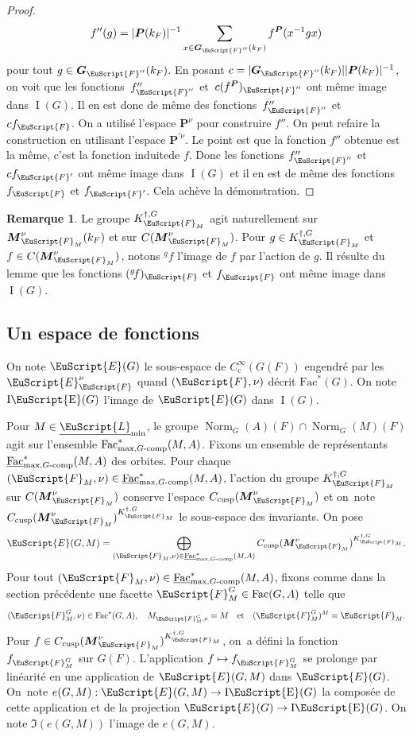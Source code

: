 \documentclass[JEP,XML,SOM,Unicode,francais]{cedram}
\let\mathcal \EuScript
\newcommand{\quadet}{\quad\text{et}\quad}
\newcommand\mto{\mathchoice{\longmapsto}{\mapsto}{\mapsto}{\mapsto}}
\newcommand{\gf}{{}^g\!f}
\newcommand{\rc}{\mathrm{c}}
\newcommand{\tcomp}{\textup{-comp}}
\newcommand{\cusp}{\mathrm{cusp}}
\newcommand{\Fac}{\mathrm{Fac}}
\DeclareMathOperator{\rI}{I}
\DeclareMathOperator{\rIE}{I\cE}
\DeclareMathOperator{\Norm}{Norm}
\newcommand{\bG}{\boldsymbol{G}}
\newcommand{\bM}{\boldsymbol{M}}
\newcommand{\bP}{\boldsymbol{P}}
\newcommand{\cE}{\mathcal{E}}
\newcommand{\cF}{\mathcal{F}}
\newcommand{\cL}{\mathcal{L}}
\theoremstyle{plain}
\theoremstyle{definition}
\newtheorem*{rem*}{Remarque}
\begin{document}
\begin{proof}
\[
f''(g)=\vert \bP(k_{F})\vert ^{-1}\sum_{x\in \bG_{\cF''}(k_{F})}f^{\bP}(x^{-1}gx)
\]
pour tout $g\in \bG_{\cF''}(k_{F})$. En posant $c=\vert \bG_{\cF''}(k_{F})\vert \vert \bP(k_{F})\vert ^{-1}$, on voit que les \hbox{fonctions~$f''_{\cF''}$} et~$c(f^{\bP})_{\cF''}$ ont même image dans $\rI(G)$. Il en est donc de même des fonctions~$f''_{\cF''}$ et~$cf_{\cF}$. On a utilisé l'espace $\bP^{\nu}$ pour construire $f''$. On peut refaire la construction en utilisant l'espace $\bP^{\prime\nu}$. Le point est que la fonction $f''$ obtenue est la même, c'est la fonction \og induite\fg de $f$. Donc les fonctions $f''_{\cF''}$ et $cf_{\cF'}$ ont même image dans $\rI(G)$ et il en est de même des fonctions $f_{\cF}$ et $f_{\cF'}$. Cela achève la démonstration.
\end{proof}

\begin{rem*}
Le groupe $ K_{\cF_{M}}^{\dag,G}$ agit naturellement sur $\bM_{\cF_{M}}^{\nu}(k_{F})$ et sur $C(\bM_{\cF_{M}}^{\nu})$. Pour $g\in K_{\cF_{M}}^{\dag,G}$ et $f\in C(\bM_{\cF_{M}}^{\nu})$, notons $\gf$ l'image de $f$ par l'action de $g$. Il résulte du lemme que les fonctions $(\gf)_{\cF}$ et $f_{\cF}$ ont même image dans $\rI(G)$.
\end{rem*}

\subsection{Un espace de fonctions}\label{unespacedefonctions}

On note $\cE(G)$ le sous-espace de $C_{\rc}^{\infty}(G(F))$ engendré par les $\cE_{\cF}^{\nu}$ quand $(\cF,\nu)$ décrit $\Fac^*(G)$. On note $\rIE(G)$ l'image de $\cE(G)$ dans $\rI(G)$.

Pour $M\in \underline{\cL}_{\min}$, le groupe $\Norm_{G}(A)(F)\cap \Norm_{G}(M)(F)$ agit sur l'ensemble $\Fac^*_{\max,G\tcomp}(M,A)$. Fixons un ensemble de représentants $ \underline{\Fac}^*_{\max,G\tcomp}(M,A)$ des orbites. Pour chaque $(\cF_{M},\nu)\in \underline{\Fac}^*_{\max,G\tcomp}(M,A)$, l'action du groupe $K_{\cF_{M}}^{\dag,G}$ sur $C(\bM_{\cF_{M}}^{\nu})$ conserve l'espace $C_{\cusp}(\bM^{\nu}_{\cF_{M}})$ et on~note $C_{\cusp}(\bM^{\nu}_{\cF_{M}})^{K_{\cF_{M}}^{\dag,G}}$ le sous-espace des invariants.
On pose
\[
\cE(G,M)=\bigoplus_{(\cF_{M},\nu)\in \underline{\Fac}^*_{\max,G\tcomp}(M,A)}C_{\cusp}(\bM^{\nu}_{\cF_{M}})^{K_{\cF_{M}}^{\dag,G}}.
\]
Pour tout $(\cF_{M},\nu)\in \underline{\Fac}^*_{\max,G\tcomp}(M,A)$, fixons comme dans la section précédente une facette $\cF_{M}^G\in \Fac(G,A)$ telle que
\[
(\cF_{M}^G,\nu)\in \Fac^*(G,A),\quad M_{\cF_{M}^G,\nu}=M\quadet (\cF_{M}^G)^M=\cF_{M}.
\]
Pour $f\in C_{\cusp}(\bM^{\nu}_{\cF_{M}})^{K_{\cF_{M}}^{\dag,G}}$, on~a défini la fonction $f_{\cF_{M}^G}$ sur $G(F)$. L'application $f\mto f_{\cF_{M}^G}$ se prolonge par linéarité en une application de $\cE(G,M)$ dans $\cE(G)$.
On~note $e(G,M):\cE(G,M)\to \rIE(G)$ la composée de cette application et de la projection $\cE(G)\to \rIE(G)$. On note $ \Im(e(G,M))$ l'image de $e(G,M)$.
\end{document}
